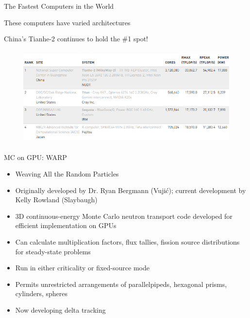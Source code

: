 \documentclass[xcolor=x11names,compress]{beamer}
\renewcommand{\(}{\begin{columns}}
\renewcommand{\)}{\end{columns}}
\newcommand{\<}[1]{\begin{column}{#1}}
\renewcommand{\>}{\end{column}}
\begin{document}
\begin{frame}{The Fastest Computers in the World \cite{top500}}

    These computers have \alert{varied} architectures
    
    \vspace*{1 em}
    China's \alert{Tianhe-2} continues to hold the \#1 spot!
    
    \begin{center}
 	\begin{figure}     
 	\includegraphics[height=2in,clip]{../figs/2014-top-4-comps}
 	\end{figure}
 	\end{center}
 	
	
\end{frame}

\begin{frame}{MC on GPU: WARP \cite{warp}}
	\begin{itemize}
	\item{Weaving All the Random Particles}
	\pause
	\item{Originally developed by Dr. Ryan Bergmann (Vuji\'{c}); current development by Kelly Rowland (Slaybaugh)}
	\pause
	\item{3D continuous-energy Monte Carlo neutron transport code developed
	     for efficient implementation on \alert{GPUs}}
	\item{Can calculate multiplication factors, flux tallies, fission source
	     distributions for steady-state problems}
	\item{Run in either criticality or fixed-source mode}
	\item{Permits unrestricted arrangements of parallelpipeds, hexagonal prisms, 
	     cylinders, spheres}
	\pause
	\item{Now developing \alert{delta tracking} \cite{woodcock}}
	\end{itemize}
\end{frame}
\end{document}
